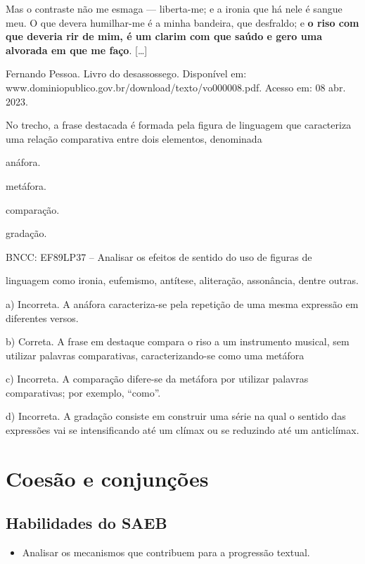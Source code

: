{Mas o contraste não me esmaga --- liberta-me; e a ironia que há nele é
sangue meu. O que devera humilhar-me é a minha bandeira, que desfraldo;
e \textbf{o riso com que deveria rir de mim, é um clarim com que saúdo e
gero uma alvorada em que me faço}. {[}\ldots{}{]}

Fernando Pessoa. Livro do desassossego. Disponível em:
www.dominiopublico.gov.br/download/texto/vo000008.pdf. Acesso em: 08
abr. 2023.

No trecho, a frase destacada é formada pela figura de linguagem que
caracteriza uma relação comparativa entre dois elementos, denominada

\begin{escolha}
\item anáfora.

\item metáfora.

\item comparação.

\item gradação.

\end{escolha}BNCC: EF89LP37 -- Analisar os efeitos de sentido do uso de figuras de

linguagem como ironia, eufemismo, antítese, aliteração, assonância,
dentre outras.

a) Incorreta. A anáfora caracteriza-se pela repetição de uma mesma
expressão em diferentes versos.

b) Correta. A frase em destaque compara o riso a um instrumento musical,
sem utilizar palavras comparativas, caracterizando-se como uma metáfora

c) Incorreta. A comparação difere-se da metáfora por utilizar palavras
comparativas; por exemplo, ``como''.

d) Incorreta. A gradação consiste em construir uma série na qual o
sentido das expressões vai se intensificando até um clímax ou se
reduzindo até um anticlímax.

\chapter{Coesão e conjunções}

\section{Habilidades do SAEB}

\begin{itemize}
\item Analisar os mecanismos que contribuem para a progressão textual.


\end{itemize}}
